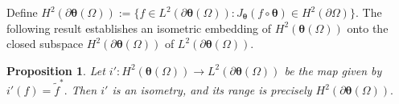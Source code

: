 \documentclass[12pt,reqno]{amsart}
\newtheorem{proposition}[theorem]{Proposition}%
\theoremstyle{remark}
\theoremstyle{definition}
\begin{document}
Define $H^2(\partial\boldsymbol \theta(\Omega)):=\{f\in  L^2(\partial\boldsymbol \theta(\Omega)): J_{\boldsymbol \theta}(f \circ \boldsymbol \theta) \in H^2(\partial\Omega)\}.$ 
The following result establishes an isometric embedding of $H^2(\boldsymbol \theta(\Omega))$ onto the closed subspace $H^2(\partial\boldsymbol \theta(\Omega))$ of $L^2(\partial\boldsymbol \theta(\Omega)).$

\begin{proposition}\label{required result 1}
    Let $i': H^2(\boldsymbol \theta(\Omega)) \to L^2(\partial\boldsymbol {\theta}(\Omega))$ be the map given by $i'(f)=\tilde{f}^*.$ Then $i'$ is an isometry, and its range is precisely $H^2(\partial\boldsymbol \theta(\Omega)).$
\end{proposition}
\end{document}
